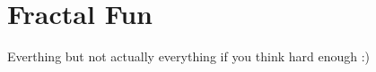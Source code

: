 \documentclass[../../Problems]{subfiles}
\begin{document}
\recalctypearea
\section{Fractal Fun}
\begin{topics}
Everthing but not actually everything if you think hard enough :)
\end{topics}


\end{document}
